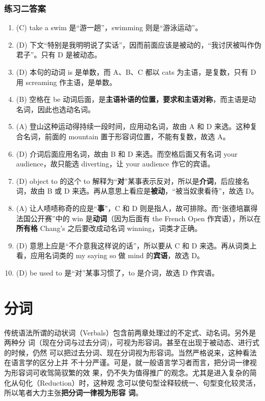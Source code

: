 \subsection{练习二答案}

\begin{enumerate}
\item (C) take a swim 是“游一趟”，swimming 则是“游泳运动”。
\item (D) 下文“特别是我明明说了实话”，因而前面应该是被动的，“我讨厌被叫作伪君子”。只有 D 是被动态。
\item (D) 本句的动词 is 是单数，而 A、B、C 都以 cats 为主语，是复数，只有 D 用 screaming 作主语，是单数。
\item (B) 空格在 be 动词后面，是\textbf{主语补语的位置，要求和主语对称}，而主语是动名词，因此也选动名词。
\item (A) 登山这种运动得持续一段时间，应用动名词，故由 A 和 D 来选。这种复合名词，前面的 mountain 置于形容词位置，不能有复数，故选 A。
\item (D) 介词后面应用名词，故由 B 和 D 来选。而空格后面又有名词 your audience，故只能选 diverting，让 your audience 作它的宾语。
\item (D) object to 的这个 to 解释为“\textbf{对}”某事表示反对，所以是\textbf{介词}，后应接名词，故由 B 或 D 来选。再从意思上看应是\textbf{被动}，“被当奴隶看待”，故选 D。
\item (A) 让人啧啧称奇的应是“\textbf{事}”，C 和 D 则是指人，故可排除。而“张德培赢得法国公开赛”中的 win 是\textbf{动词}（因为后面有 the French Open 作宾语），所以在\textbf{所有格} Chang's 之后要改成动名词 winning，词类才正确。
\item (D) 意思上应是“不介意我这样说的话”，所以要从 C 和 D 来选。再从词类上看，应用名词类的 my saying so 做 mind 的\textbf{宾语}，故选 D。
\item (D) be used to 是“对”某事习惯了，to 是介词，故选 D 作宾语。
\end{enumerate}


\chapter{分词}

传统语法所谓的动状词（Verbals）包含前两章处理过的不定式、动名词。另外是两种分
词（现在分词与过去分词)，可视为形容词。甚至在出现于被动态、进行式的时候，仍然
可以把过去分词、现在分词视为形容词。当然严格说来，这种看法在语言学的区分上并
不十分严谨。可是，就一般语言学习者而言，把分词一律视为形容词可收驾简驭繁的效
果，仍不失为值得推广的观念。尤其是进入复杂的简化从句化（Reduction）时，这种观
念可以使句型诠释较统一、句型变化较灵活，所以笔者大力主张\textbf{把分词一律视为形容
  词}。

